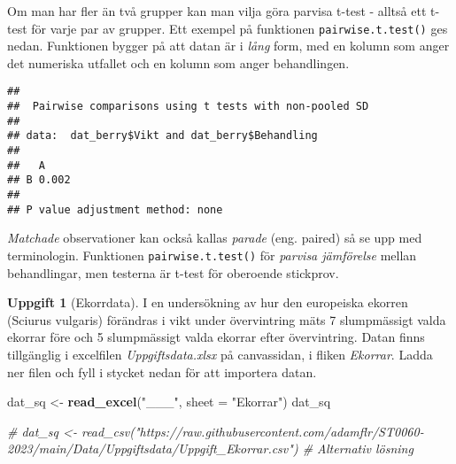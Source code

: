 \documentclass[
]{book}
\newenvironment{Shaded}{\begin{snugshade}}{\end{snugshade}}
\newcommand{\AttributeTok}[1]{\textcolor[rgb]{0.13,0.29,0.53}{#1}}
\newcommand{\CommentTok}[1]{\textcolor[rgb]{0.56,0.35,0.01}{\textit{#1}}}
\newcommand{\FunctionTok}[1]{\textcolor[rgb]{0.13,0.29,0.53}{\textbf{#1}}}
\newcommand{\NormalTok}[1]{#1}
\newcommand{\OtherTok}[1]{\textcolor[rgb]{0.56,0.35,0.01}{#1}}
\newcommand{\SpecialCharTok}[1]{\textcolor[rgb]{0.81,0.36,0.00}{\textbf{#1}}}
\newcommand{\StringTok}[1]{\textcolor[rgb]{0.31,0.60,0.02}{#1}}
\theoremstyle{definition}
\theoremstyle{definition}
\theoremstyle{definition}
\newtheorem{exercise}{Uppgift}[chapter]
\theoremstyle{definition}
\theoremstyle{remark}
\begin{document}
Om man har fler än två grupper kan man vilja göra parvisa t-test - alltså ett t-test för varje par av grupper.
Ett exempel på funktionen \texttt{pairwise.t.test()} ges nedan. Funktionen bygger på att datan är i \emph{lång} form, med en kolumn som anger det numeriska utfallet och en kolumn som anger behandlingen.

\begin{Shaded}
\end{Shaded}

\begin{verbatim}
## 
##  Pairwise comparisons using t tests with non-pooled SD 
## 
## data:  dat_berry$Vikt and dat_berry$Behandling 
## 
##   A    
## B 0.002
## 
## P value adjustment method: none
\end{verbatim}

\emph{Matchade} observationer kan också kallas \emph{parade} (eng. paired) så se upp med terminologin. Funktionen \texttt{pairwise.t.test()} för \emph{parvisa jämförelse} mellan behandlingar, men testerna är t-test för oberoende stickprov.

\begin{exercise}[Ekorrdata]

I en undersökning av hur den europeiska ekorren (Sciurus vulgaris) förändras i vikt under övervintring mäts 7 slumpmässigt valda ekorrar före och 5 slumpmässigt valda ekorrar efter övervintring. Datan finns tillgänglig i excelfilen \emph{Uppgiftsdata.xlsx} på canvassidan, i fliken \emph{Ekorrar}. Ladda ner filen och fyll i stycket nedan för att importera datan.

\begin{Shaded}
\begin{Highlighting}[]
\NormalTok{dat\_sq }\OtherTok{\textless{}{-}} \FunctionTok{read\_excel}\NormalTok{(}\StringTok{"\_\_\_"}\NormalTok{, }\AttributeTok{sheet =} \StringTok{"Ekorrar"}\NormalTok{)}
\NormalTok{dat\_sq}

\CommentTok{\# dat\_sq \textless{}{-} read\_csv("https://raw.githubusercontent.com/adamflr/ST0060{-}2023/main/Data/Uppgiftsdata/Uppgift\_Ekorrar.csv") \# Alternativ lösning}
\end{Highlighting}
\end{Shaded}

\end{exercise}
\end{document}
